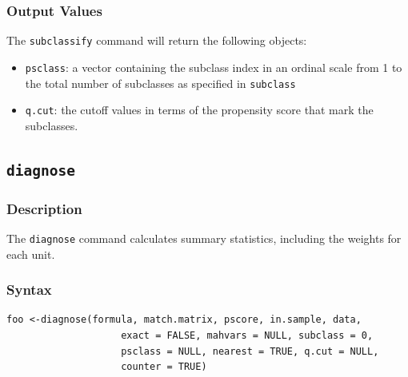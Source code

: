 \documentclass[oneside,letterpaper,titlepage]{article}
\begin{document}
\begin{appendix}
\subsubsection{Output Values}
The \texttt{subclassify} command will return the following objects: 
\begin{itemize}
\item \texttt{psclass}: a vector containing the subclass index in an ordinal scale
  from 1 to the total number of subclasses as specified in
  \texttt{subclass} 
\item \texttt{q.cut}: the cutoff values in terms of the propensity score that
  mark the subclasses.
\end{itemize}

\subsection{\texttt{diagnose}}

\subsubsection{Description}
The \texttt{diagnose} command calculates summary statistics, including
the weights for each unit.

\subsubsection{Syntax}
\begin{verbatim}
foo <-diagnose(formula, match.matrix, pscore, in.sample, data,
                    exact = FALSE, mahvars = NULL, subclass = 0,
                    psclass = NULL, nearest = TRUE, q.cut = NULL,
                    counter = TRUE)
\end{verbatim} 


\end{appendix}
\end{document}
